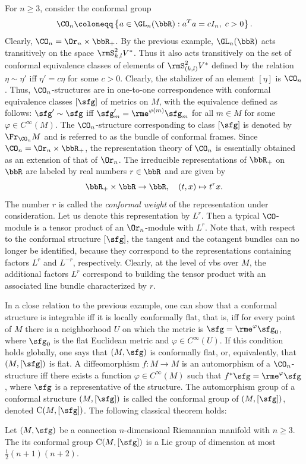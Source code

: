 \begin{example}
    For $n\geq 3$, consider the conformal group 
    \[\CO_n\coloneqq \left\{a\in\GL_n(\bbR):a^Ta=cI_n,\; c>0\right\}.\]
    Clearly, $\CO_n=\Or_n\times\bbR_+$. By the previous example, $\GL_n(\bbR)$ acts transitively on the space $\rmS^2_{k,l}V^\ast$. Thus it also acts transitively on the set of conformal equivalence classes of elements of $\rmS^2_{(k,l)}V^\ast$ defined by the relation $\eta\sim\eta'$ iff $\eta'=c\eta$ for some $c>0$. Clearly, the stabilizer of an element $[\eta]$ is $\CO_n$. Thus, $\CO_n$-structures are in one-to-one correspondence with conformal equivalence classes $[\sfg]$ of metrics on $M$, with the equivalence defined as follows: $\sfg'\sim\sfg$ iff $\sfg'_m=\rme^{\varphi(m)}\sfg_m$ for all $m\in M$ for some $\varphi\in C^\infty(M)$. The $\CO_n$-structure corresponding to class $[\sfg]$ is denoted by $\Fr_{\CO_n}M$ and is referred to as the bundle of conformal frames.
    Since $\CO_n=\Or_n\times\bbR_+$, the representation theory of $\CO_n$ is essentially obtained as an extension of that of $\Or_n$. The irreducible representations of $\bbR_+$ on $\bbR$ are labeled by real numbers $r\in\bbR$ and are given by 
    \[\bbR_+\times\bbR\to \bbR,\quad (t,x)\mapsto t^r x.\]
    The number $r$ is called the \emph{conformal weight} of the representation under consideration. Let us denote this representation by $L^r$. Then a typical $\CO$-module is a tensor product of an $\Or_n$-module with $L^r$. Note that, with respect to the conformal structure $[\sfg]$, the tangent and the cotangent bundles can no longer be identified, because they correspond to the representations containing factors $L^r$ and $L^{-r}$, respectively. Clearly, at the level of \glspl{vb} over $M$, the additional factors $L^r$ correspond to building the tensor product with an associated line bundle characterized by $r$.

    In a close relation to the previous example, one can show that a conformal structure is integrable iff it is locally conformally flat, that is, iff for every point of $M$ there is a neighborhood $U$ on which the metric is $\sfg=\rme^{\varphi}\sfg_0$, where $\sfg_0$ is the flat Euclidean metric and $\varphi\in C^\infty(U)$. If this condition holds globally, one says that $(M,\sfg)$ is conformally flat, or, equivalently, that $(M,[\sfg])$ is flat. A diffeomorphism $f:M\to M$ is an automorphism of a $\CO_n$-structure iff there exists a function $\varphi\in C^\infty(M)$ such that $f^\ast\sfg=\rme^\varphi \sfg$, where $\sfg$ is a representative of the structure. The automorphism group of a conformal structure $(M,[\sfg])$ is called the conformal group of $(M,[\sfg])$, denoted $\mathrm{C}(M,[\sfg])$. The following classical theorem holds: 
    \begin{thm}\label{thm Liouville conformal}
        Let $(M,\sfg)$ be a connection $n$-dimensional Riemannian manifold with $n\geq 3$. The its conformal group $\mathrm{C}(M,[\sfg])$ is a Lie group of dimension at most $\frac12(n+1)(n+2)$.
    \end{thm}
\end{example}


